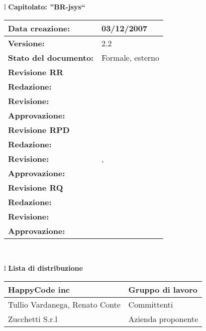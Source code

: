 

\newcommand{\lv}{ 2.2 } %
\newcommand{\dt}{ Glossario }%


\begin{center}
\thispagestyle{plain}
\begin{table}[htbp]
\large{
\begin{tabular}{l}
\Large{\textbf{\textsf{Capitolato: ''BR-jsys``}}} \\
\begin{tabular}{|p{6cm}|p{6cm}|}
\hline
\textbf{Data creazione:} & 03/12/2007 \\ \hline
\textbf{Versione:} & \lv \\ \hline
\textbf{Stato del documento:} & Formale, esterno \\ \hline
\textbf{Revisione RR} & \\ \hline
\textbf{Redazione:} & \MB \\ \hline
\textbf{Revisione:} & \MT \\ \hline
\textbf{Approvazione:}  & \ET \\ \hline
\textbf{Revisione RPD} & \\ \hline
\textbf{Redazione:} & \LA \\ \hline
\textbf{Revisione:} & \AT, \MB  \\ \hline
\textbf{Approvazione:}  & \MB \\ \hline
\textbf{Revisione RQ} & \\ \hline
\textbf{Redazione:} & \MM \\ \hline
\textbf{Revisione:} & \ET \\ \hline
\textbf{Approvazione:}  & \AT \\ \hline
\end{tabular} \\
\end{tabular}
}
\end{table}

\begin{table}[hbtp]
\large{
\begin{tabular}{l}
\Large{\textbf{\textsf{Lista di distribuzione}}} \\
\begin{tabular}{|p{6cm}|p{6cm}|} \hline
{HappyCode inc}& Gruppo di lavoro \\ \hline
{Tullio Vardanega, Renato Conte}& Committenti \\ \hline 
{Zucchetti S.r.l}& Azienda proponente\\ \hline
\end{tabular} \\
\end{tabular}
}
\end{table}
\begin{table}[hbtp]


\end{table}
\end{center}
